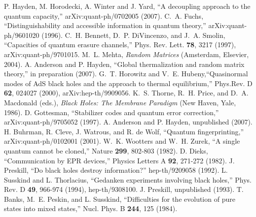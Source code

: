 \documentclass[12pt]{article}
\begin{document}
\begin{thebibliography}{99}
 P. Hayden, M. Horodecki, A. Winter and J. Yard, ``A decoupling approach to the quantum capacity,'' arXiv:quant-ph/0702005 (2007).
 C.~A. Fuchs, ``Distinguishability and accessible information in quantum theory,'' arXiv:quant-ph/9601020 (1996). 
 C.~H. Bennett, D.~P. DiVincenzo, and J.~A. Smolin, ``Capacities of quantum erasure channels,'' Phys. Rev. Lett. {\bf 78}, 3217 (1997), arXiv:quant-ph/9701015. 
 M.~L. Mehta, {\em Random Matrices} (Amsterdam, Elsevier, 2004). 
 A. Anderson and P. Hayden, ``Global thermalization and random matrix
theory,'' in preparation (2007).
 G.~T. Horowitz and V.~E. Hubeny,``Quasinormal modes of AdS black holes and the approach to thermal equilibrium,'' Phys.Rev. D {\bf 62}, 024027 (2000), arXiv:hep-th/9909056.
 K.~S. Thorne, R.~H. Price, and D.~A. Macdonald (eds.), {\em Black Holes: The Membrane Paradigm} (New Haven, Yale, 1986).
 D. Gottesman, ``Stabilizer codes and quantum error correction,'' arXiv:quant-ph/9705052 (1997). 
 A. Anderson and P. Hayden, unpublished (2007).
  H. Buhrman, R. Cleve, J. Watrous, and R. de Wolf, ``Quantum fingerprinting,'' arXiv:quant-ph/0102001 (2001).
 W.~K. Wootters and W.~H. Zurek, ``A single quantum cannot be cloned,'' Nature {\bf 299}, 802-803 (1982).
 D. Dieks, ``Communication by EPR devices,'' Physics Letters A {\bf 92}, 271-272 (1982).
 J. Preskill, ``Do black holes destroy information?'' hep-th/9209058 (1992).
 L. Susskind and L. Thorlacius, ``Gedanken experiments involving black holes,'' Phys. Rev. D {\bf 49}, 966-974 (1994), hep-th/9308100.
 J. Preskill, unpublished (1993).
 T. Banks, M.~E. Peskin, and L. Susskind, ``Difficulties for the evolution of pure states into mixed states,'' Nucl. Phys. B {\bf 244}, 125 (1984).

\end{thebibliography}
\end{document}
